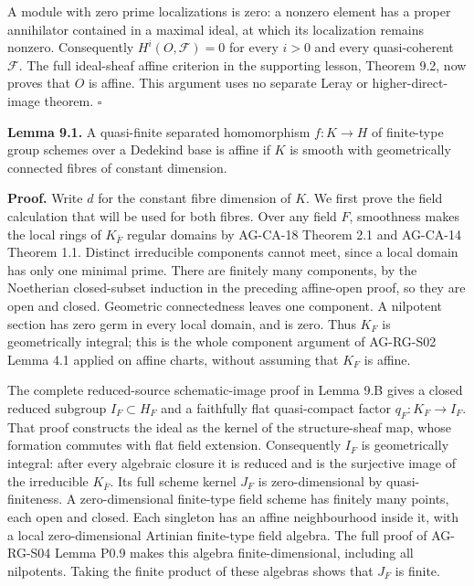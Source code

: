 \documentclass[11pt,a4paper,openany]{report}
\begin{document}
A module with zero prime localizations is zero: a nonzero element has a proper annihilator contained in a maximal ideal, at which its localization remains nonzero. Consequently \(H^i(O,\mathcal F)=0\) for every \(i>0\) and every quasi-coherent \(\mathcal F\). The full ideal-sheaf affine criterion in the supporting lesson, Theorem 9.2, now proves that \(O\) is affine. This argument uses no separate Leray or higher-direct-image theorem. \(\square\)

\textbf{Lemma 9.1.} A quasi-finite separated homomorphism \(f:K\to H\) of finite-type group schemes over a Dedekind base is affine if \(K\) is smooth with geometrically connected fibres of constant dimension.

\textbf{Proof.} Write \(d\) for the constant fibre dimension of \(K\). We first prove the field calculation that will be used for both fibres. Over any field \(F\), smoothness makes the local rings of \(K_{\bar F}\) regular domains by AG-CA-18 Theorem 2.1 and AG-CA-14 Theorem 1.1. Distinct irreducible components cannot meet, since a local domain has only one minimal prime. There are finitely many components, by the Noetherian closed-subset induction in the preceding affine-open proof, so they are open and closed. Geometric connectedness leaves one component. A nilpotent section has zero germ in every local domain, and is zero. Thus \(K_F\) is geometrically integral; this is the whole component argument of AG-RG-S02 Lemma 4.1 applied on affine charts, without assuming that \(K_F\) is affine.

The complete reduced-source schematic-image proof in Lemma 9.B gives a closed reduced subgroup \(I_F\subset H_F\) and a faithfully flat quasi-compact factor \(q_F:K_F\to I_F\). That proof constructs the ideal as the kernel of the structure-sheaf map, whose formation commutes with flat field extension. Consequently \(I_F\) is geometrically integral: after every algebraic closure it is reduced and is the surjective image of the irreducible \(K_{\bar F}\). Its full scheme kernel \(J_F\) is zero-dimensional by quasi-finiteness. A zero-dimensional finite-type field scheme has finitely many points, each open and closed. Each singleton has an affine neighbourhood inside it, with a local zero-dimensional Artinian finite-type field algebra. The full proof of AG-RG-S04 Lemma P0.9 makes this algebra finite-dimensional, including all nilpotents. Taking the finite product of these algebras shows that \(J_F\) is finite.
\end{document}
